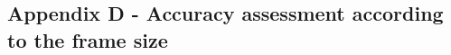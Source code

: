 \documentclass[letterpaper]{article}
\begin{document}
\subsection{Appendix D - Accuracy assessment according to the frame size}

\begin{table}
\vskip 0.25cm
\caption{Scores obtained using Lomb-Scargle and a Maximum Key-profile Correlation approach, without any overlay and
without taking the temporal aspect into account.}
\end{table}
\end{document}
